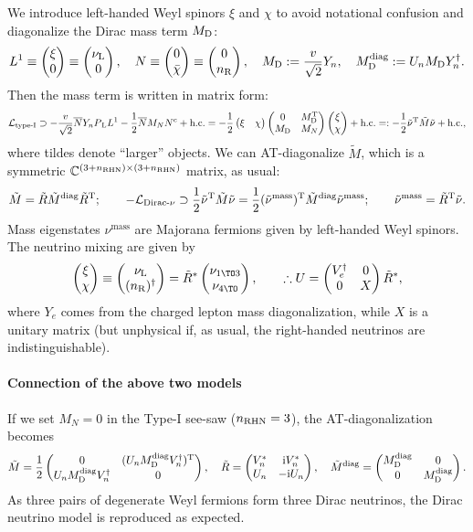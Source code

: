 \documentclass[CheatSheet]{subfiles}
\begin{document}
We introduce left-handed Weyl spinors $\xi$ and $\chi$ to avoid notational confusion and diagonalize the Dirac mass term $M\w{D}$:
\begin{equation}
 L^1 \equiv \pmat{\xi\\0}\equiv \pmat{\nuL\\0},\quad
 N   \equiv \pmat{0\\\bar\chi}\equiv \pmat{0\\\nR},\quad
 M\w{D} := \frac{v}{\sqrt2}Y_n,\quad
 M\w{D}\wdiag := U_n M\w{D} Y_n^\dagger.
\end{equation}
Then the mass term is written in matrix form:
\begin{align}
\label{eq:MajoranaNuLag}
 \mathcal L_{\text{type-I}}
\supset
 -\frac{v}{\sqrt2}\overline{N}Y_n \PL L^1 - \frac{1}{2}\overline{N}M_N  N^\cc + \text{h.c.}
=-\frac12\pmat{\xi & \chi}\pmat{0 & M\w{D}^\TT \\ M\w{D} & M_N } \pmat{\xi \\ \chi} + \text{h.c.} =: -\frac12\tilde\nu^\TT \tilde M\tilde \nu+\text{h.c.},
\end{align}
where tildes denote ``larger'' objects. We can AT-diagonalize $\tilde M$, which is a symmetric $\mathbb{C}^{(3+n\w{RHN})\times(3+n\w{RHN})}$ matrix, as usual:
\begin{equation}
  \tilde M = \tilde R \tilde M\wdiag \tilde R^\TT;
\qquad
-\mathcal L\w*{Dirac-$\nu$}\supset
\frac12\tilde \nu^\TT \tilde M\tilde\nu
=\frac12(\tilde\nu^{\text{mass}})^\TT \tilde M\wdiag \tilde\nu^{\text{mass}};\qquad \tilde\nu^{\text{mass}} =\tilde R^\TT\tilde\nu.
\end{equation}
Mass eigenstates $\nu^{\text{mass}}$ are Majorana fermions given by left-handed Weyl spinors.
The neutrino mixing are given by
\begin{equation}
 \pmat{\xi\\\chi} \equiv \pmat{\nuL\\(\nR)^\dagger} = \tilde R^*\pmat{\nu_{1\TO3} \\ \nu_{4\TO}},\qquad
 \therefore
   U = \pmat{V_e^\dagger & 0 \\ 0 & X}\tilde R^*,
\label{eq:type-I-mixing}
\end{equation}
where $Y_e$ comes from the charged lepton mass diagonalization, while $X$ is a unitary matrix (but unphysical if, as usual, the right-handed neutrinos are indistinguishable).


\paragraph{Connection of the above two models}
If we set $M_N =0$ in the Type-I see-saw ($n\w{RHN}=3$), the AT-diagonalization becomes
\begin{align}
\tilde M = \frac12\pmat{0 & (U_nM\w{D}\wdiag V_n^\dagger)^\TT \\ U_nM\w{D}\wdiag V_n^\dagger & 0},\quad
  \tilde R=\pmat{V_n^* & \ii V_n^* \\ U_n & -\ii U_n},\quad
  \tilde M\wdiag=\pmat{M\w{D}\wdiag & 0 \\ 0 & M\w{D}\wdiag}.
\end{align}
As three pairs of degenerate Weyl fermions form three Dirac neutrinos, the Dirac neutrino model is reproduced as expected.
\end{document}
